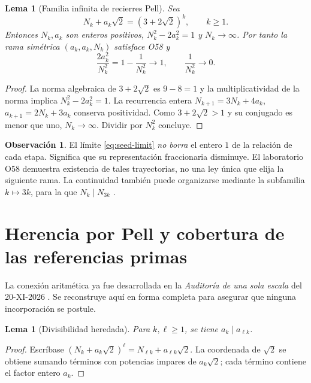 \documentclass[11pt,a4paper]{article}
\theoremstyle{mine}
\newtheorem{lema}[teorema]{Lema}
\theoremstyle{definition}
\newtheorem{observacion}[teorema]{Observación}
\begin{document}
\begin{lema}[Familia infinita de recierres Pell]\label{le:pell}
Sea
\begin{equation}\label{eq:pell}
N_k+a_k\sqrt2=(3+2\sqrt2)^k,\qquad k\ge1.
\end{equation}
Entonces $N_k,a_k$ son enteros positivos, $N_k^2-2a_k^2=1$ y $N_k\to\infty$. Por tanto la rama simétrica $(a_k,a_k,N_k)$ satisface O58 y
\begin{equation}\label{eq:seed-limit}
\frac{2a_k^2}{N_k^2}=1-\frac1{N_k^2}\longrightarrow1,
\qquad \frac1{N_k^2}\longrightarrow0.
\end{equation}
\end{lema}
\begin{proof}
La norma algebraica de $3+2\sqrt2$ es $9-8=1$ y la multiplicatividad de la norma implica $N_k^2-2a_k^2=1$. La recurrencia entera
$N_{k+1}=3N_k+4a_k$, $a_{k+1}=2N_k+3a_k$ conserva positividad. Como $3+2\sqrt2>1$ y su conjugado es menor que uno, $N_k\to\infty$. Dividir por $N_k^2$ concluye.
\end{proof}

\begin{observacion}
El límite \eqref{eq:seed-limit} \emph{no borra} el entero $1$ de la relación de cada etapa. Significa que su representación fraccionaria disminuye. El laboratorio O58 demuestra existencia de tales trayectorias, no una ley única que elija la siguiente rama. La continuidad también puede organizarse mediante la subfamilia $k\mapsto3k$, para la que $N_k\mid N_{3k}$ \cite{O58}.
\end{observacion}

\section{Herencia por Pell y cobertura de las referencias primas}

La conexión aritmética ya fue desarrollada en la \emph{Auditoría de una sola escala} del 20-XI-2026 \cite{PellAudit}. Se reconstruye aquí en forma completa para asegurar que ninguna incorporación se postule.

\begin{lema}[Divisibilidad heredada]\label{le:div}
Para $k,\ell\ge1$, se tiene $a_k\mid a_{\ell k}$.
\end{lema}
\begin{proof}
Escríbase $(N_k+a_k\sqrt2)^\ell=N_{\ell k}+a_{\ell k}\sqrt2$. La coordenada de $\sqrt2$ se obtiene sumando términos con potencias impares de $a_k\sqrt2$; cada término contiene el factor entero $a_k$.
\end{proof}
\end{document}

